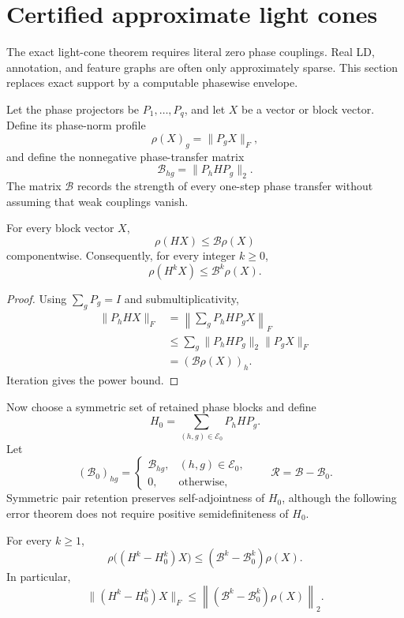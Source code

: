 \section{Certified approximate light cones}
\label{sec:approx-lightcone}

The exact light-cone theorem requires literal zero phase couplings.  Real LD,
annotation, and feature graphs are often only approximately sparse.  This
section replaces exact support by a computable phasewise envelope.

Let the phase projectors be $P_1,\ldots,P_q$, and let $X$ be a vector or block
vector.  Define its phase-norm profile
\[
\rho(X)_g=\lVert P_gX\rVert_F,
\]
and define the nonnegative phase-transfer matrix
\[
\mathcal B_{hg}=\lVert P_hHP_g\rVert_2.
\]
The matrix $\mathcal B$ records the strength of every one-step phase transfer
without assuming that weak couplings vanish.

\begin{theorem}
\label{thm:weighted-transfer}
For every block vector $X$,
\[
\boxed{
\rho(HX)\leq \mathcal B\rho(X)
}
\]
componentwise.  Consequently, for every integer $k\geq0$,
\[
\boxed{
\rho(H^kX)\leq \mathcal B^k\rho(X).
}
\]
\end{theorem}

\begin{proof}
Using $\sum_gP_g=I$ and submultiplicativity,
\[
\begin{aligned}
\lVert P_hHX\rVert_F
&=\left\lVert\sum_gP_hHP_gX\right\rVert_F\\
&\leq\sum_g\lVert P_hHP_g\rVert_2\lVert P_gX\rVert_F\\
&=(\mathcal B\rho(X))_h.
\end{aligned}
\]
Iteration gives the power bound.
\end{proof}

Now choose a symmetric set of retained phase blocks and define
\[
H_0=\sum_{(h,g)\in\mathcal E_0}P_hHP_g.
\]
Let
\[
(\mathcal B_0)_{hg}=
\begin{cases}
\mathcal B_{hg},&(h,g)\in\mathcal E_0,\\
0,&\text{otherwise},
\end{cases}
\qquad
\mathcal R=\mathcal B-\mathcal B_0.
\]
Symmetric pair retention preserves self-adjointness of $H_0$, although the
following error theorem does not require positive semidefiniteness of $H_0$.

\begin{theorem}
\label{thm:thresholded-power}
For every $k\geq1$,
\[
\boxed{
\rho\bigl((H^k-H_0^k)X\bigr)
\leq
(\mathcal B^k-\mathcal B_0^k)\rho(X).
}
\]
In particular,
\[
\boxed{
\lVert(H^k-H_0^k)X\rVert_F
\leq
\left\lVert(\mathcal B^k-\mathcal B_0^k)\rho(X)\right\rVert_2.
}
\]
\end{theorem}

